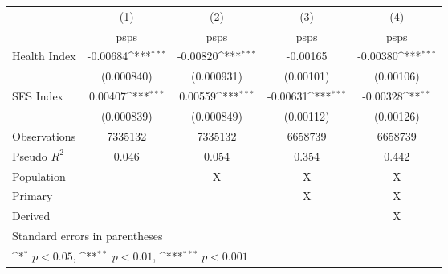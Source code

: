 {
\def\sym#1{\ifmmode^{#1}\else\(^{#1}\)\fi}
\begin{tabular}{l*{4}{c}}
\hline\hline
                    &\multicolumn{1}{c}{(1)}         &\multicolumn{1}{c}{(2)}         &\multicolumn{1}{c}{(3)}         &\multicolumn{1}{c}{(4)}         \\
                    &        psps         &        psps         &        psps         &        psps         \\
\hline
Health Index        &    -0.00684\sym{***}&    -0.00820\sym{***}&    -0.00165         &    -0.00380\sym{***}\\
                    &  (0.000840)         &  (0.000931)         &   (0.00101)         &   (0.00106)         \\
[1em]
SES Index           &     0.00407\sym{***}&     0.00559\sym{***}&    -0.00631\sym{***}&    -0.00328\sym{**} \\
                    &  (0.000839)         &  (0.000849)         &   (0.00112)         &   (0.00126)         \\
\hline
Observations        &     7335132         &     7335132         &     6658739         &     6658739         \\
Pseudo \(R^{2}\)    &       0.046         &       0.054         &       0.354         &       0.442         \\
Population          &                     &           X         &           X         &           X         \\
Primary             &                     &                     &           X         &           X         \\
Derived             &                     &                     &                     &           X         \\
\hline\hline
\multicolumn{5}{l}{\footnotesize Standard errors in parentheses}\\
\multicolumn{5}{l}{\footnotesize \sym{*} \(p<0.05\), \sym{**} \(p<0.01\), \sym{***} \(p<0.001\)}\\
\end{tabular}
}

